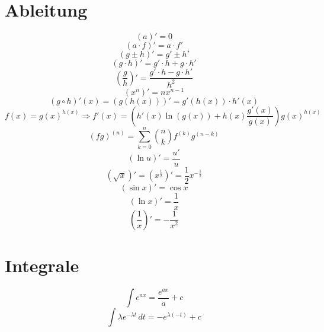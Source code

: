 \documentclass[a4paper,twocolumn]{article}
\begin{document}
\newpage
\section{Ableitung}

\[
    \left(a\right)' = 0
\] \[
    (a\cdot f)' = a\cdot f'
\] \[
    \left(g \pm h\right)' = g' \pm h'
\] \[
    (g\cdot h)' = g' \cdot h + g \cdot h'
\] \[
    \left(\frac{g}{h}\right)' = \frac{g' \cdot h - g \cdot h'}{h^2}
\] \[
    \left(x^n\right)' = n x^{n-1}
\] \[
    (g \circ h)'(x) = (g(h(x)))' = g'(h(x))\cdot h'(x)
\] \[
    f(x)=g(x)^{h(x)} \Rightarrow f'(x) = \left(h'(x)\ln(g(x)) + h(x) \frac{g'(x)}{g(x)}\right) g(x)^{h(x)}
\] \[
    (fg)^{(n)} = \sum_{k=0}^n {n \choose k} f^{(k)} g^{(n-k)}
\] \[
    (\ln{u})' = \frac{u'}{u}
\] \[
    (\sqrt{x})' = (x^{\frac12})' = \frac12 x^{-\frac12}
\] \[
    (\sin{x})' = \cos{x}
\] \[
    (\ln{x})' = \frac1{x}
\] \[
    (\frac1{x})' = -\frac{1}{x^2}
\]

\section{Integrale}

\[
    \int e^{ax} = \frac{e^{ax}}{a} + c
\] \[
    \int \lambda e^{-\lambda t}\,dt = -e^{\lambda (-t)} + c
\]
\end{document}
